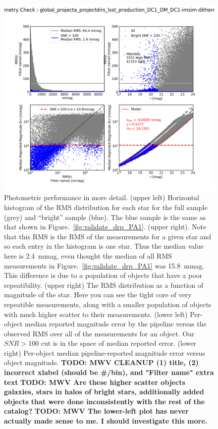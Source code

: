 \documentclass[\docopts]{\docclass}
\begin{document}
\begin{figure}
\centering
\includegraphics[width=0.9\columnwidth]{DC1-imsim-dithered_r_check_photometry.png}
\caption{Photometric performance in more detail.  (upper left) Horizontal histogram of the RMS distribution for each star for the full sample (grey) and ``bright'' sample (blue).  The blue sample is the same as that shown in Figure.~\ref{fig:validate_drp_PA1}.
(upper right).  Note that this RMS is the RMS of the measurements for a given star and so each entry in the histogram is one star.  Thus the median value here is 2.4~mmag, even thought the median of all RMS measurements in Figure.~\ref{fig:validate_drp_PA1} was 15.8~mmag.  This difference is due to a population of objects that have a poor repeatibility.
(upper right) The RMS distribution as a function of magnitude of the star.  Here you can see the tight core of very repeatible measurements, along with a smaller population of objects with much higher scatter to their measurements.
(lower left) Per-object median reported magnitude error by the pipeline versus the observed RMS over all of the measurements for an object.  Our $SNR>100$ cut is in the space of median reported error.
(lower right)
Per-object median pipeline-reported magnitude error versus object magnitude. 
 {\bf TODO: MWV CLEANUP (1) title, (2) incorrect xlabel (should be \#/bin),  and "Filter name" extra text}
 {\bf TODO: MWV  Are these higher scatter objects galaxies, stars in halos of bright stars, additionally added objects that were done inconsistently with the rest of the catalog?}
 {\bf TODO: MWV  The lower-left plot has never actually made sense to me.  I should investigate this more.}}

\label{fig:validate_drp_check_photometry}
\end{figure}
\end{document}
